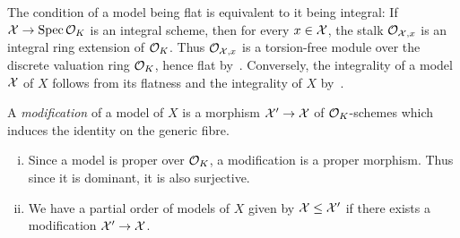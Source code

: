 \begin{remark} \label{rem:flatIffIntegral}
    The condition of a model being flat is equivalent to it being integral:
    If $\mathcal X \to \operatorname{Spec} \mathcal O_K $ is an integral scheme, then for every $x\in \mathcal X$, the stalk $\mathcal{O}_{\mathcal X,x}$ is an integral ring extension of $\mathcal O_K$.
    Thus $\mathcal{O}_{\mathcal X,x}$ is a torsion-free module over the discrete valuation ring $\mathcal O_K$, hence flat by~\cite[Corollary 1.2.14]{Liu}.
    Conversely, the integrality of a model $\mathcal X$ of $X$ follows from its flatness and the integrality of $X$ by~\cite[Proposition 4.3.8]{Liu}.
\end{remark}

\begin{definition}
    A \textit{modification} of a model of $X$ is a morphism $\mathcal X' \to \mathcal X$ of $\mathcal O_K $-schemes which induces the
    identity on the generic fibre.
\end{definition}

\begin{remark}\label{rem:modifications-are-surjective-and-partial-order-of-models}
    \begin{enumerate}[(i)]
        \item Since a model is proper over $\mathcal O_K $, a modification is a proper morphism.
            Thus since it is dominant, it is also surjective.
        \item We have a partial order of models of $X$ given by $\mathcal X \leq \mathcal X'$ if there exists a modification $\mathcal X' \to \mathcal X$.
    \end{enumerate}
\end{remark}

